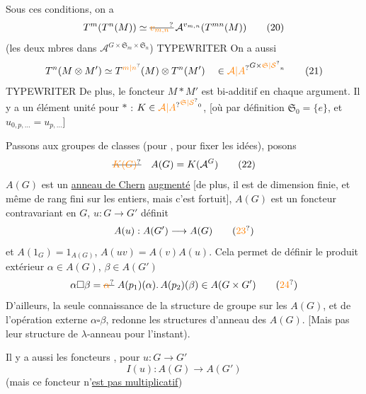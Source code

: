 Sous ces conditions, on a
\[
T^m(T^n(M))\simeq\deleted{\unsure{v_{m,n}}}\,\mathcal A^{v_{m,n}}(T^{mn}(M)) \tag*{(20)}
\]
(les deux mbres dans $\mathcal A^{G\times\mathfrak S_m\times\mathfrak S_n}$)
  TYPEWRITER  
On a aussi
\[
T^n(M\otimes M')\simeq T^{\unsure{m|n}}(M)\otimes T^n(M')\quad\in{\unsure{\mathcal A|A}}^{G\times\unsure{\mathfrak S|\mathcal S}_n} \tag*{(21)}
\]
  TYPEWRITER  
De plus, le foncteur $M*M'$ est bi-additif en chaque
argument. Il y a un élément unité pour $*$ :
$K\in{\unsure{\mathcal A|A}}^{\unsure{\mathfrak S|\mathcal S}_0}$,  [où par définition $\mathfrak S_0=\{e\}$, et $u_{0,p,\ldots}=u_{p,\ldots}$]

Passons aux groupes de classes (pour ,
pour fixer les idées), posons
\[
\deleted{\unsure{K(G)}}\quad A(G)=K(\mathcal A^G) \tag*{(22)}
\]
$A(G)$ est un  \uline{anneau de Chern}
\uline{} \uline{augmenté} [de plus, il est de dimension
finie, et même de rang fini sur les entiers, mais
c'est fortuit], $A(G)$ est un foncteur
 contravariant en $G$, $u:G\longrightarrow G'$ définit
\[
A(u):A(G')\longrightarrow A(G) \tag*{(\unsure{23})}
\]
et $A(1_G)=1_{A(G)}$, $A(uv)=A(v)A(u)$. Cela permet de
définir le produit extérieur $\alpha\in A(G)$, $\beta\in A(G')$
\[
\alpha\square\beta=\deleted{\unsure{\alpha}}\ A(p_1)(\alpha).\,A(p_2)(\beta)\in A(G\times G') \tag*{(\unsure{24})}
\]
D'ailleurs, la seule connaissance de la structure de
groupe sur les $A(G)$, et de l'opération externe
$\alpha\square\beta$, redonne les structures d'anneau  des $A(G)$.
[Mais pas leur structure de $\lambda$-anneau pour l'instant).

Il y a aussi les foncteurs , pour $u:G\longrightarrow G'$
\[
I(u):A(G)\longrightarrow A(G') \tag*{(25)}
\]
(mais ce foncteur n'\uline{est pas multiplicatif})

